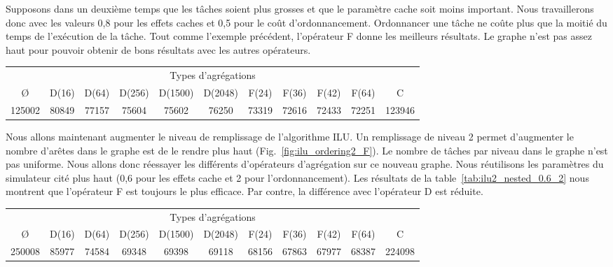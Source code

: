 Supposons dans un deuxième temps que les tâches soient plus grosses et que le paramètre cache soit moins important.
%
Nous travaillerons donc avec les valeurs 0,8 pour les effets caches et 0,5 pour le coût d'ordonnancement.
%
Ordonnancer une tâche ne coûte plus que la moitié du temps de l'exécution de la tâche.
%
Tout comme l'exemple précédent, l'opérateur F donne les meilleurs résultats.
%
Le graphe n'est pas assez haut pour pouvoir obtenir de bons résultats avec les autres opérateurs.


\begin{center}
  \begin{tabular}{|c|c|c|c|c|c|c|c|c|c|c|}
    \hline
    \multicolumn{11}{|c|}{Types d'agrégations}\\
    \O & D(16) & D(64) & D(256) & D(1500) & D(2048) & F(24) & F(36) & F(42) & F(64) & C \\
    \hline
    125002 & 80849 & 77157 & 75604 & 75602 & 76250 & 73319 & 72616 & 72433 & 72251 & 123946 \\
    \hline
  \end{tabular}
  \label{tab:ilu0_nested_0.8_0.5}
\end{center}


Nous allons maintenant augmenter le niveau de remplissage de l'algorithme ILU.
%
Un remplissage de niveau 2 permet d'augmenter le nombre d'arêtes dans le graphe est de le rendre plus haut (Fig.~\ref{fig:ilu_ordering2_F}).
%
Le nombre de tâches par niveau dans le graphe n'est pas uniforme.
%
Nous allons donc réessayer les différents d'opérateurs d'agrégation sur ce nouveau graphe.
%
Nous réutilisons les paramètres du simulateur cité plus haut (0,6 pour les effets cache et 2 pour l'ordonnancement).
%
Les résultats de la table~\ref{tab:ilu2_nested_0.6_2} nous montrent que l'opérateur F est toujours le plus efficace.
%
Par contre, la différence avec l'opérateur D est réduite.


\begin{center}
  \begin{tabular}{|c|c|c|c|c|c|c|c|c|c|c|}
    \hline
    \multicolumn{11}{|c|}{Types d'agrégations}\\
    \O & D(16) & D(64) & D(256) & D(1500) & D(2048) & F(24) & F(36) & F(42) & F(64) & C \\
    \hline
    250008 & 85977 & 74584 & 69348 & 69398 & 69118 & 68156 & 67863 & 67977 & 68387 & 224098 \\
    \hline
  \end{tabular}
  \label{tab:ilu2_nested_0.6_2}
\end{center}


